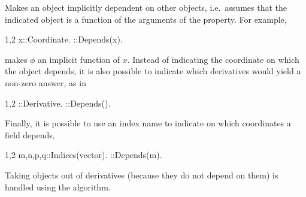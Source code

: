 
Makes an object implicitly dependent on other objects, i.e.~assumes
that the indicated object is a function of the arguments of the
property. For example,
\begin{screen}{1,2}
x::Coordinate.
\phi::Depends(x).
\end{screen}
makes $\phi$ an implicit function of $x$. Instead of indicating the
coordinate on which the object depends, it is also possible to
indicate which derivatives would yield a non-zero answer, as in
\begin{screen}{1,2}
\nabla{#}::Derivative.
\phi::Depends(\nabla).
\end{screen}
Finally, it is possible to use an index name to indicate on which
coordinates a field depends,
\begin{screen}{1,2}
{m,n,p,q}::Indices(vector).
\phi::Depends(m).
\end{screen}

Taking objects out of derivatives (because they do not depend on them)
is handled using the  algorithm.


